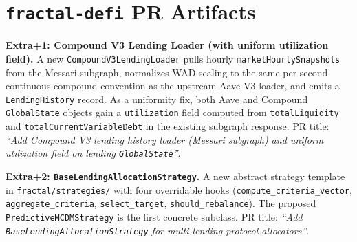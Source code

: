 \documentclass[11pt,a4paper]{article}
\begin{document}






\appendix

\section{\texttt{fractal-defi} PR Artifacts}
\label{app:prs}
\label{sec:contributions-detail}

\textbf{Extra+1: Compound V3 Lending Loader (with uniform utilization
field).} A new \texttt{CompoundV3LendingLoader} pulls hourly
\texttt{marketHourlySnapshots} from the Messari subgraph, normalizes
WAD scaling to the same per-second continuous-compound convention as
the upstream Aave V3 loader, and emits a \texttt{LendingHistory}
record. As a uniformity fix, both Aave and Compound \texttt{GlobalState}
objects gain a \texttt{utilization} field computed from
\texttt{totalLiquidity} and \texttt{totalCurrentVariableDebt} in the
existing subgraph response. PR title:
\emph{``Add Compound V3 lending history loader (Messari subgraph) and
uniform utilization field on lending \texttt{GlobalState}''}.

\textbf{Extra+2: \texttt{BaseLendingAllocationStrategy}.} A new
abstract strategy template in \texttt{fractal/strategies/} with four
overridable hooks (\texttt{compute\_criteria\_vector},
\texttt{aggregate\_criteria}, \texttt{select\_target},
\texttt{should\_rebalance}). The proposed
\texttt{PredictiveMCDMStrategy} is the first concrete subclass.
PR title: \emph{``Add \texttt{BaseLendingAllocationStrategy}
for multi-lending-protocol allocators''}.
\end{document}
